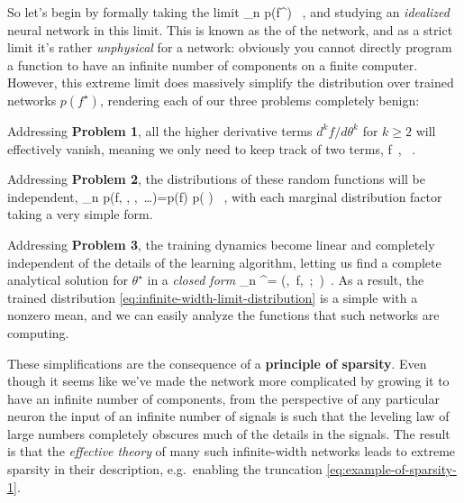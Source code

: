 So let's begin by 
formally taking the limit
\be\label{eq:infinite-width-limit-distribution}
\lim_{n \to \infty} p(f^\star) \, ,
\ee
and studying an \emph{idealized} neural network in this limit.
This is known as the  of the network, and
as a strict limit
it's rather \emph{unphysical} for a
network: obviously you cannot directly program a function to have an infinite number of components on a finite computer.
However, this extreme limit does massively simplify the distribution over trained networks $p(f^\star)$, rendering each of our three problems completely benign: 
\bi
\item Addressing \textbf{Problem 1}, all the higher derivative terms $d^k f/d\theta^k$ for $k\geq 2$ will effectively vanish, meaning we only need to keep track of two terms,
\be\label{eq:example-of-sparsity-1}
f\, , \quad {}\, .
\ee
\item Addressing \textbf{Problem 2}, the distributions of these random functions will be independent, 
\be\label{eq:example-of-sparsity-2}
\lim_{n \to \infty}  p\!\le(f, , ,\, \dots  \ri)=p\!\le(f\ri) p\!\le( \ri) \, ,
\ee 
with each marginal distribution factor taking a very simple form. 
\item Addressing \textbf{Problem 3}, the training dynamics become linear and completely independent of the details of the learning algorithm, letting us find a complete analytical solution for $\theta^\star$ in a \emph{closed form}
\be\label{eq:example-of-sparsity-3}
\lim_{n \to \infty}\theta^\star = \le[\theta^{\star}\ri]\!\le(\theta,\, f,\, ;\, \ri)\, .
\ee
\ei
As a result, the trained distribution \eqref{eq:infinite-width-limit-distribution} is a simple  with a nonzero mean, and we can easily analyze the functions that such networks are computing. 










These simplifications are the consequence  of a \textbf{principle of sparsity}.
Even though it seems like we've made the network more complicated 
by growing  it to have an infinite number of components, from the perspective of any particular neuron the 
input of an infinite number of signals is such that the leveling law of large numbers completely obscures much of the details in the signals. The result is that the \emph{effective theory} of many such infinite-width networks leads to extreme sparsity 
in their description,
e.g.~enabling the truncation \eqref{eq:example-of-sparsity-1}. 


